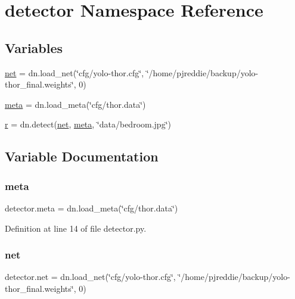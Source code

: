 \hypertarget{namespacedetector}{}\section{detector Namespace Reference}
\label{namespacedetector}
\subsection*{Variables}
\begin{DoxyCompactItemize}
\item 
\mbox{\hyperlink{namespacedetector_a2d5cb51517045a5de5fc1b439ea5caf1}{net}} = dn.\+load\+\_\+net(\char`\"{}cfg/yolo-\/thor.\+cfg\char`\"{}, \char`\"{}/home/pjreddie/backup/yolo-\/thor\+\_\+final.\+weights\char`\"{}, 0)
\item 
\mbox{\hyperlink{namespacedetector_aedc2b8598b9d478706ca6e093b188642}{meta}} = dn.\+load\+\_\+meta(\char`\"{}cfg/thor.\+data\char`\"{})
\item 
\mbox{\hyperlink{namespacedetector_a1887c1b46d5441587cbf44391c466bf8}{r}} = dn.\+detect(\mbox{\hyperlink{namespacedetector_a2d5cb51517045a5de5fc1b439ea5caf1}{net}}, \mbox{\hyperlink{namespacedetector_aedc2b8598b9d478706ca6e093b188642}{meta}}, \char`\"{}data/bedroom.\+jpg\char`\"{})
\end{DoxyCompactItemize}


\subsection{Variable Documentation}
\mbox{\label{namespacedetector_aedc2b8598b9d478706ca6e093b188642}} 
\subsubsection{\texorpdfstring{meta}{meta}}
{\footnotesize\ttfamily detector.\+meta = dn.\+load\+\_\+meta(\char`\"{}cfg/thor.\+data\char`\"{})}



Definition at line 14 of file detector.\+py.

\mbox{\label{namespacedetector_a2d5cb51517045a5de5fc1b439ea5caf1}} 
\subsubsection{\texorpdfstring{net}{net}}
{\footnotesize\ttfamily detector.\+net = dn.\+load\+\_\+net(\char`\"{}cfg/yolo-\/thor.\+cfg\char`\"{}, \char`\"{}/home/pjreddie/backup/yolo-\/thor\+\_\+final.\+weights\char`\"{}, 0)}



